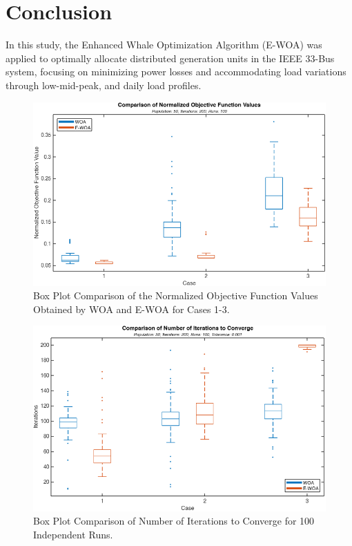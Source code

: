 \documentclass[conference]{IEEEtran}
\begin{document}
\section{Conclusion}\label{sec:conclusion}
In this study, the Enhanced Whale Optimization Algorithm (E-WOA) was applied to optimally allocate distributed generation units in the IEEE 33-Bus system, focusing on minimizing power losses and accommodating  load variations through low-mid-peak, and daily load profiles.


\begin{figure}[htbp]
	\vspace{-13pt}
	\centerline{\includegraphics[width=1\columnwidth]{objectivefunction.png}}
	\vspace{-10pt}
	\caption{Box Plot Comparison of the Normalized Objective Function Values Obtained by WOA and E-WOA for Cases 1-3.}
	\vspace{-5pt}
	\label{fig:objectivefunction}
\end{figure}


\begin{figure}[htbp]
	\vspace{-20pt}
	\centerline{\includegraphics[width=1\columnwidth]{speedconvergence.png}}
	\vspace{-5pt}
	\caption{Box Plot Comparison of Number of Iterations to Converge for 100 Independent Runs.}
	\vspace{-10pt}
	\label{fig:speedconvergence}
\end{figure}
\end{document}
